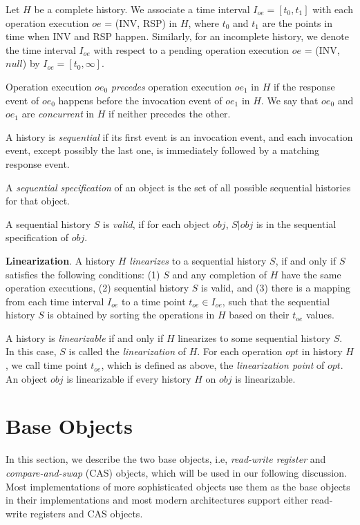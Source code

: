 Let $H$ be a complete history. We associate a time interval $I_{oe} = [t_0, t_1]$ with each
operation execution $oe$ = (INV, RSP) in $H$, where $t_0$ and $t_1$ are the points in time when INV and RSP happen.
Similarly, for an incomplete history, we denote the time interval $I_{oe}$ with respect to a pending
operation execution $oe$ = (INV, $null$) by $I_{oe} = [t_0, \infty]$.

Operation execution $oe_0$ \emph{precedes} operation execution $oe_1$ in $H$ if the response event of
$oe_0$ happens before the invocation event of $oe_1$ in $H$.
We say that $oe_0$ and $oe_1$ are \emph{concurrent} in $H$ if neither precedes the other.

A history is \emph{sequential} if its first event is an invocation event, and each invocation event, except
possibly the last one, is immediately followed by a matching response event.

A \emph{sequential specification} of an object is the set of all possible sequential histories
for that object.

A sequential history $S$ is \emph{valid}, if for each object $obj$, $S|obj$ is
in the sequential specification of $obj$.

\textbf{Linearization}.
A history $H$ \emph{linearizes} to a sequential history $S$, if and only if $S$ satisfies the
following conditions: (1) $S$ and any completion of $H$ have the same operation executions, (2) sequential history $S$ is
valid, and (3) there is a mapping from each time interval $I_{oe}$ to a time point $t_{oe} \in I_{oe}$, such
that the sequential history $S$ is obtained by sorting the operations in $H$ based on their $t_{oe}$ values.

A history is \emph{linearizable} if and only if $H$ linearizes to some sequential history $S$. In this case,
$S$ is called the \emph{linearization} of $H$. For each operation $opt$ in history $H$, we call time point $t_{oe}$, which is
defined as above, the \emph{linearization point} of $opt$. An object $obj$ is linearizable if every
history $H$ on $obj$ is linearizable.

\section{Base Objects}
In this section, we describe the two base objects, i.e, \emph{read-write register} and \emph{compare-and-swap} (CAS) objects, which will be used in our following discussion. Most implementations
of more sophisticated objects use them as the base objects in their implementations and
most modern architectures support either read-write registers and CAS objects\cite{itanium}\cite{weaver1994sparc}.

